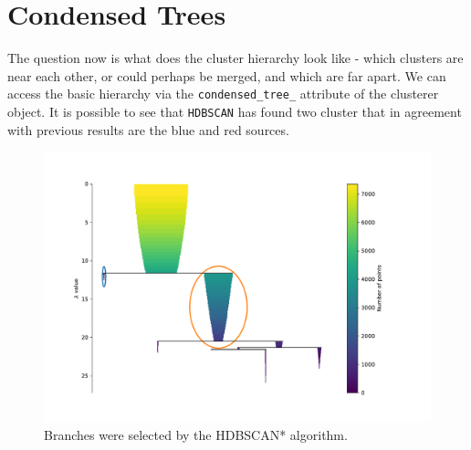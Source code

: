 \documentclass[fleqn,usenatbib]{mnras}
\begin{document}







\appendix
\section{Condensed Trees}
The question now is what does the cluster hierarchy look like - which
clusters are near each other, or could perhaps be merged, and which
are far apart. We can access the basic hierarchy via the \texttt{condensed\_tree\_}
attribute of the clusterer object. It is possible to see that \texttt{HDBSCAN} has found
two cluster that in agreement with previous results are the blue and red sources.

\begin{figure}
	\includegraphics[width=0.9\linewidth]{Figs/cluster-hierarchy-hdbscan.pdf}
        \caption{Branches were selected by the HDBSCAN* algorithm.}
    \label{fig:emission}
\end{figure}


\newcommand\TableHeader{
  \hline\hline
  Id Simbad & \(\mathrm{RA}\) & \(\mathrm{Dec}\) & Type & Group -- {\sc hca}
                          & P(Blue) -- {\sc hdbscan} & P(Red) -- {\sc hdbscan} \\
  \hline 
}
\end{document}

